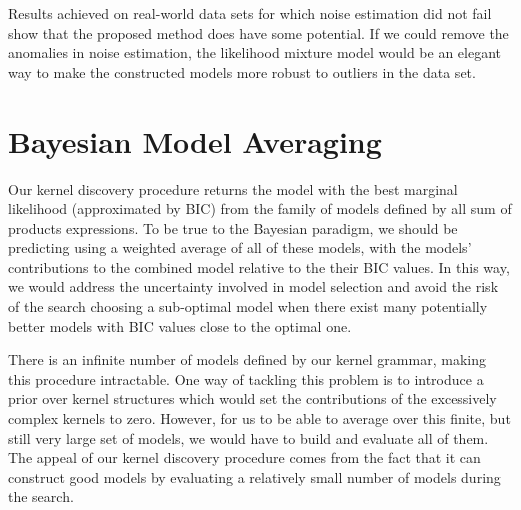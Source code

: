 \documentclass[a4paper,12pt ]{report}
\begin{document}
Results achieved on real-world data sets for which noise estimation did not fail show that the proposed method does have some potential. If we could remove the anomalies in noise estimation, the likelihood mixture model would be an elegant way to make the constructed models more robust to outliers in the data set.


\section{Bayesian Model Averaging}

Our kernel discovery procedure returns the model with the best marginal likelihood (approximated by BIC) from the family of models defined by all sum of products expressions. To be true to the Bayesian paradigm, we should be predicting using a weighted average of all of these models, with the models' contributions to the combined model relative to the their BIC values. In this way, we would address the uncertainty involved in model selection and avoid the risk of the search choosing a sub-optimal model when there exist many potentially better models with BIC values close to the optimal one.

There is an infinite number of models defined by our kernel grammar, making this procedure intractable. One way of tackling this problem is to introduce a prior over kernel structures which would set the contributions of the excessively complex kernels to zero. However, for us to be able to average over this finite, but still very large set of models, we would have to build and evaluate all of them. The appeal of our kernel discovery procedure comes from the fact that it can construct good models by evaluating a relatively small number of models during the search.
\end{document}
